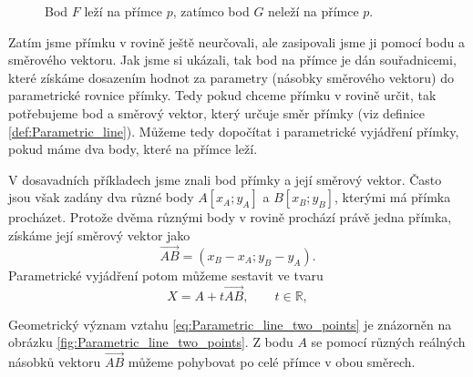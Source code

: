 \begin{figure}[H]
    \centering
    \caption{Bod $F$ leží na přímce $p$, zatímco bod $G$ neleží na přímce $p$.}
    \label{fig:Parametric_line_points}
\end{figure}

Zatím jsme přímku v rovině ještě neurčovali, ale zasipovali jsme ji pomocí bodu a směrového vektoru.
Jak jsme si ukázali, tak bod na přímce je dán souřadnicemi, které získáme dosazením hodnot za parametry (násobky směrového vektoru) do parametrické rovnice přímky.
Tedy pokud chceme přímku v rovině určit, tak potřebujeme bod a směrový vektor, který určuje směr přímky (viz definice \ref{def:Parametric_line}).
Můžeme tedy dopočítat i parametrické vyjádření přímky, pokud máme dva body, které na přímce leží.

V dosavadních příkladech jsme znali bod přímky a její směrový vektor. Často jsou však zadány dva různé body $A[x_A;y_A]$ a $B[x_B;y_B]$, kterými má přímka procházet. Protože dvěma různými body v rovině prochází právě jedna přímka, získáme její směrový vektor jako
\[
    \overrightarrow{AB}=(x_B-x_A;y_B-y_A).
\]
Parametrické vyjádření potom můžeme sestavit ve tvaru
\begin{equation}\label{eq:Parametric_line_two_points}
    X=A+t\overrightarrow{AB},\qquad t\in\mathbb{R},
\end{equation}

Geometrický význam vztahu \eqref{eq:Parametric_line_two_points}
je znázorněn na obrázku \ref{fig:Parametric_line_two_points}.
Z bodu $A$ se pomocí různých reálných násobků vektoru
$\overrightarrow{AB}$ můžeme pohybovat po celé přímce v obou směrech.

